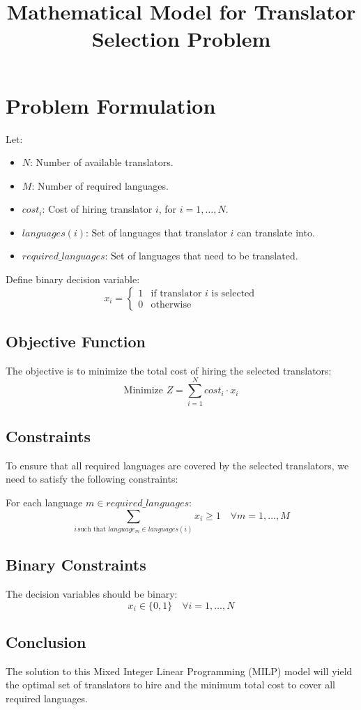 \documentclass{article}
\begin{document}
\title{Mathematical Model for Translator Selection Problem}
\author{}
\date{}
\maketitle

\section*{Problem Formulation}

Let:
\begin{itemize}
    \item $N$: Number of available translators.
    \item $M$: Number of required languages.
    \item $cost_i$: Cost of hiring translator $i$, for $i = 1, \ldots, N$.
    \item $languages(i)$: Set of languages that translator $i$ can translate into.
    \item $required\_languages$: Set of languages that need to be translated.
\end{itemize}

Define binary decision variable:
\[
x_i = 
\begin{cases} 
1 & \text{if translator } i \text{ is selected} \\
0 & \text{otherwise}
\end{cases}
\]

\subsection*{Objective Function}
The objective is to minimize the total cost of hiring the selected translators:
\[
\text{Minimize } Z = \sum_{i=1}^{N} cost_i \cdot x_i
\]

\subsection*{Constraints}
To ensure that all required languages are covered by the selected translators, we need to satisfy the following constraints:

For each language $m \in required\_languages$:
\[
\sum_{i \, \text{such that } language_m \in languages(i)} x_i \geq 1 \quad \forall m = 1, \ldots, M
\]

\subsection*{Binary Constraints}
The decision variables should be binary:
\[
x_i \in \{0, 1\} \quad \forall i = 1, \ldots, N
\]

\subsection*{Conclusion}
The solution to this Mixed Integer Linear Programming (MILP) model will yield the optimal set of translators to hire and the minimum total cost to cover all required languages.
\end{document}
